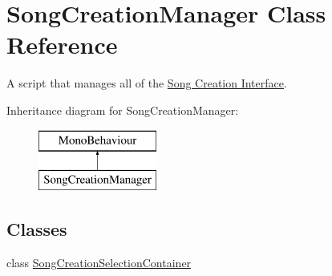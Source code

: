 \hypertarget{class_song_creation_manager}{}\section{Song\+Creation\+Manager Class Reference}
\label{class_song_creation_manager}


A script that manages all of the \hyperlink{group___doc_s_c}{Song Creation Interface}.  


Inheritance diagram for Song\+Creation\+Manager\+:\begin{figure}[H]
\begin{center}
\leavevmode
\includegraphics[height=2.000000cm]{class_song_creation_manager}
\end{center}
\end{figure}
\subsection*{Classes}
\begin{DoxyCompactItemize}
\item 
class \hyperlink{group___s_c_m_nest_class_class_song_creation_manager_1_1_song_creation_selection_container}{Song\+Creation\+Selection\+Container}
\end{DoxyCompactItemize}
